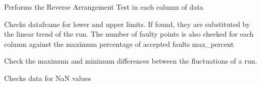 \documentclass[a4paper,10pt,english]{sphinxmanual}
\begin{document}
\begin{fulllineitems}
\label{pymicra:pymicra.tests.check_RA}
Performs the Reverse Arrangement Test in each column of data

\end{fulllineitems}


\begin{fulllineitems}
\label{pymicra:pymicra.tests.check_limits}
Checks dataframe for lower and upper limits. If found, they are substituted by 
the linear trend of the run. The number of faulty points is also checked for each
column against the maximum percentage of accepted faults max\_percent

\end{fulllineitems}


\begin{fulllineitems}
\label{pymicra:pymicra.tests.check_maxdif}
Check the maximum and minimum differences between the fluctuations of a run.

\end{fulllineitems}


\begin{fulllineitems}
\label{pymicra:pymicra.tests.check_nans}
Checks data for NaN values

\end{fulllineitems}

\end{document}
